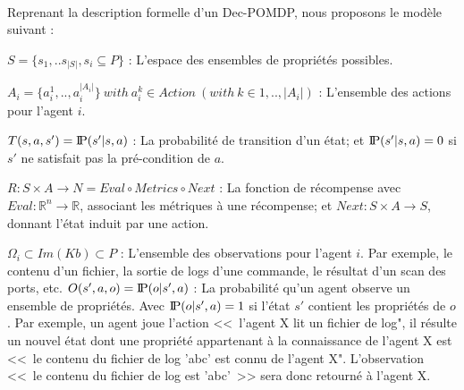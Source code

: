 \documentclass[french]{pfia}
\newcommand{\probP}{\text{I\kern-0.15em P}}
\begin{document}
\ 

Reprenant la description formelle d'un Dec-POMDP\cite{OliehoekA16}, nous proposons le modèle suivant :

 $S = \{s_1, ..s_{|S|}, s_{i} \subseteq P\}$ : L'espace des ensembles de propriétés possibles.

 $A_i = \{a_{i}^{1},..,a_{i}^{|A_{i}|}\} \: with \: a_{i}^k \in Action \: (with \: k \in {1, .., |A_i|})$ : L'ensemble des actions pour l'agent $i$.
 
 $T(s,a,s') = \probP{(s'|s,a)}$ : La probabilité de transition d'un état; et $\probP{(s'|s,a)} = 0$ si $s'$ ne satisfait pas la pré-condition de $a$.

 $R: S \times A \rightarrow N = Eval \circ Metrics \circ Next$ : La fonction de récompense avec $Eval: \mathbb{R}^n \rightarrow \mathbb{R}$, associant les métriques à une récompense; et $Next: S \times A \rightarrow S$, donnant l'état induit par une action.

 $\Omega_i \subset Im(Kb) \subset P$ : L'ensemble des observations pour l'agent $i$. Par exemple, le contenu d'un fichier, la sortie de logs d'une commande, le résultat d'un scan des ports, etc.
 $O(s',a,o) = \probP{(o|s',a)}$ : La probabilité qu'un agent observe un ensemble de propriétés. Avec $\probP{(o|s',a)} = 1$ si l'état $s'$ contient les propriétés de $o$.
 Par exemple, un agent joue l'action <<~l'agent X lit un fichier de log", il résulte un nouvel état dont une propriété appartenant à la connaissance de l'agent X est <<~le contenu du fichier de log 'abc' est connu de l'agent X". L'observation <<~le contenu du fichier de log est 'abc'~>> sera donc retourné à l'agent X.

\ 










\end{document}
